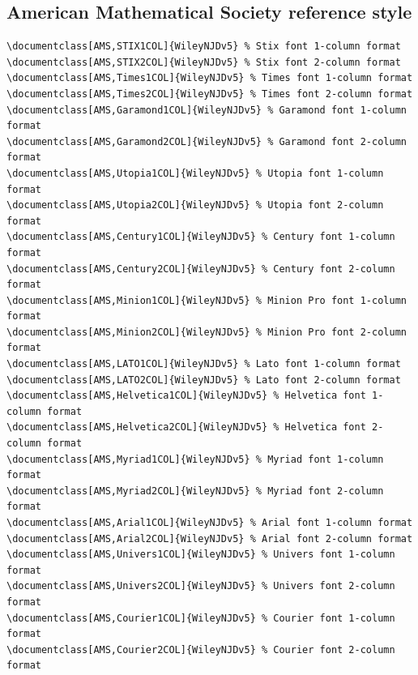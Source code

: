 \documentclass[11pt]{article}
\begin{document}
\subsection*{American Mathematical Society reference style}
{\fontsize{9}{10}\selectfont\begin{verbatim}
\documentclass[AMS,STIX1COL]{WileyNJDv5} % Stix font 1-column format
\documentclass[AMS,STIX2COL]{WileyNJDv5} % Stix font 2-column format
\documentclass[AMS,Times1COL]{WileyNJDv5} % Times font 1-column format
\documentclass[AMS,Times2COL]{WileyNJDv5} % Times font 2-column format
\documentclass[AMS,Garamond1COL]{WileyNJDv5} % Garamond font 1-column format
\documentclass[AMS,Garamond2COL]{WileyNJDv5} % Garamond font 2-column format
\documentclass[AMS,Utopia1COL]{WileyNJDv5} % Utopia font 1-column format
\documentclass[AMS,Utopia2COL]{WileyNJDv5} % Utopia font 2-column format
\documentclass[AMS,Century1COL]{WileyNJDv5} % Century font 1-column format
\documentclass[AMS,Century2COL]{WileyNJDv5} % Century font 2-column format
\documentclass[AMS,Minion1COL]{WileyNJDv5} % Minion Pro font 1-column format
\documentclass[AMS,Minion2COL]{WileyNJDv5} % Minion Pro font 2-column format
\documentclass[AMS,LATO1COL]{WileyNJDv5} % Lato font 1-column format
\documentclass[AMS,LATO2COL]{WileyNJDv5} % Lato font 2-column format
\documentclass[AMS,Helvetica1COL]{WileyNJDv5} % Helvetica font 1-column format
\documentclass[AMS,Helvetica2COL]{WileyNJDv5} % Helvetica font 2-column format
\documentclass[AMS,Myriad1COL]{WileyNJDv5} % Myriad font 1-column format
\documentclass[AMS,Myriad2COL]{WileyNJDv5} % Myriad font 2-column format
\documentclass[AMS,Arial1COL]{WileyNJDv5} % Arial font 1-column format
\documentclass[AMS,Arial2COL]{WileyNJDv5} % Arial font 2-column format
\documentclass[AMS,Univers1COL]{WileyNJDv5} % Univers font 1-column format
\documentclass[AMS,Univers2COL]{WileyNJDv5} % Univers font 2-column format
\documentclass[AMS,Courier1COL]{WileyNJDv5} % Courier font 1-column format
\documentclass[AMS,Courier2COL]{WileyNJDv5} % Courier font 2-column format
\end{verbatim}}
\end{document}
